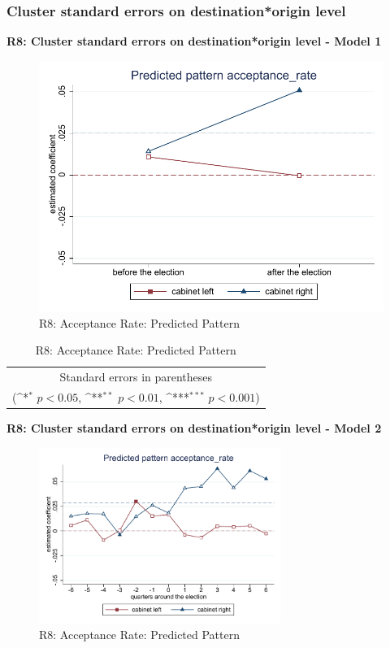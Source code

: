 \documentclass[10pt,a4paper]{scrartcl}
\begin{document}
\subsubsection{Cluster standard errors on destination*origin level}
\textbf{R8: Cluster standard errors on destination*origin level - Model 1}
\begin{figure}[!ht]
	\centering
	\includegraphics[width=1\textwidth]{figures_edited/acceptance_rate_graph1_R8.pdf}
	\caption{R8: Acceptance Rate: Predicted Pattern}
\end{figure}

\begin{table}[!ht]\centering
	\renewcommand{\arraystretch}{1.25}
	\def\sym#1{\ifmmode^{#1}\else\(^{#1}\)\fi}
	\caption{R8: Acceptance Rate: Predicted Pattern}
	\begin{tabular}{l*{2}{c}}
		\hline\hline
		
		\hline\hline
		\multicolumn{3}{c}{\footnotesize Standard errors in parentheses} \\
		\multicolumn{3}{c}{\footnotesize (\sym{*} \(p<0.05\), \sym{**} \(p<0.01\), \sym{***} \(p<0.001\))}\\
	\end{tabular}
\end{table}

\clearpage
\textbf{R8: Cluster standard errors on destination*origin level - Model 2}
\begin{figure}[!ht]
	\centering
	\includegraphics[width=0.7\textwidth]{figures_edited/acceptance_rate_graph2_R8.pdf}
	\caption{R8: Acceptance Rate: Predicted Pattern}
\end{figure}
\end{document}
